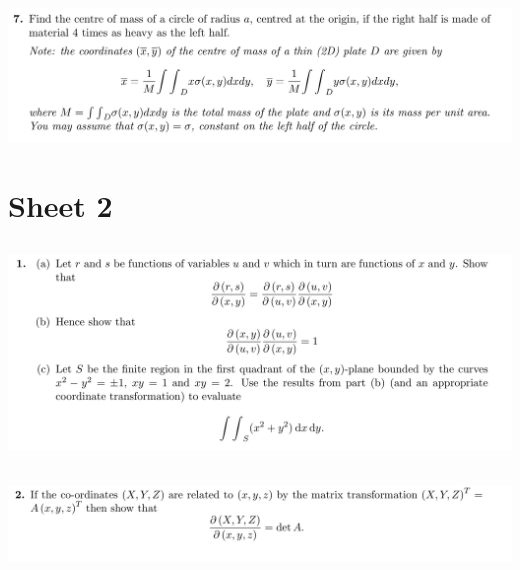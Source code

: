 \subsection{}
\begin{mdframed}
  \includegraphics[width=400pt]{img/oxford-prelims-M5-multivariable-calc-1-7.png}
\end{mdframed}


\newpage
\section{Sheet 2}

\subsection{}
\begin{mdframed}
  \includegraphics[width=400pt]{img/oxford-prelims-M5-multivariable-calc-2-1.png}
\end{mdframed}

\subsection{}
\begin{mdframed}
  \includegraphics[width=400pt]{img/oxford-prelims-M5-multivariable-calc-2-2.png}
\end{mdframed}

